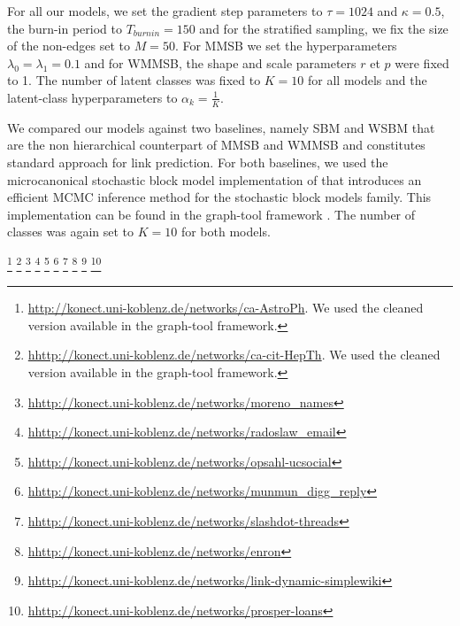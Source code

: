 For all our models, we set the gradient step parameters to $\tau=1024$ and $\kappa=0.5$, the burn-in period to $T_{burnin}=150$ and for the stratified sampling, we fix the size of the non-edges set to  $M=50$. For MMSB we set the hyperparameters $\lambda_0=\lambda_1=0.1$ and for WMMSB, the shape and scale parameters $r$ et $p$ were fixed to 1. The number of latent classes was fixed to $K=10$ for all models and the latent-class hyperparameters to $\alpha_k=\frac{1}{K}$.


We compared our models against two baselines, namely SBM and WSBM that are the non hierarchical counterpart of MMSB and WMMSB and constitutes standard approach for link prediction. For both baselines, we used the microcanonical stochastic block model implementation of \cite{peixoto2018nonparametric} that introduces an efficient MCMC inference method for the stochastic block models family. This implementation can be found in the graph-tool framework \cite{peixoto_graph-tool_2014}. The number of classes was again set to $K=10$ for both models.


\textcolor{white}{ %
\footnote{\url{http://konect.uni-koblenz.de/networks/ca-AstroPh}. We used the cleaned version available in the  graph-tool framework.}
\footnote{\url{hhttp://konect.uni-koblenz.de/networks/ca-cit-HepTh}. We used the cleaned version available in the  graph-tool framework.}
\footnote{\url{hhttp://konect.uni-koblenz.de/networks/moreno_names}}
\footnote{\url{hhttp://konect.uni-koblenz.de/networks/radoslaw_email}}
\footnote{\url{hhttp://konect.uni-koblenz.de/networks/opsahl-ucsocial}}
\footnote{\url{hhttp://konect.uni-koblenz.de/networks/munmun_digg_reply}}
\footnote{\url{hhttp://konect.uni-koblenz.de/networks/slashdot-threads}}
\footnote{\url{hhttp://konect.uni-koblenz.de/networks/enron}}
\footnote{\url{hhttp://konect.uni-koblenz.de/networks/link-dynamic-simplewiki}}
\footnote{\url{hhttp://konect.uni-koblenz.de/networks/prosper-loans}}
}
\begin{figure}[h]
\centering
	
   \label{fig:roc}
\end{figure}


